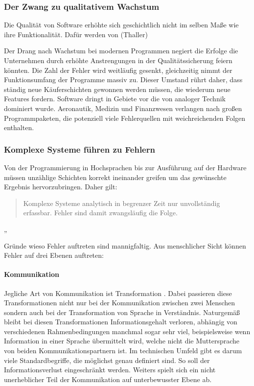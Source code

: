 \subsubsection{Der Zwang zu qualitativem Wachstum}
Die Qualität von Software erhöhte sich geschichtlich nicht im selben Maße wie ihre Funktionalität. Dafür werden von (Thaller)\cite{thaller_software-test:_2002}

Der Drang nach Wachstum bei modernen Programmen negiert die Erfolge die Unternehmen durch erhöhte Anstrengungen in der Qualitätssicherung feiern könnten. Die Zahl der Fehler wird weitläufig gesenkt,  gleichzeitig nimmt der Funktionsumfang der Programme massiv zu. Dieser Umstand rührt daher, dass ständig neue Käuferschichten gewonnen werden müssen, die wiederum neue Features fordern.
Software dringt in Gebiete vor die von analoger Technik dominiert wurde. Aeronautik, Medizin und Finanzwesen verlangen nach großen Programmpaketen, die potenziell viele Fehlerquellen mit weichreichenden Folgen enthalten.

\subsubsection{Komplexe Systeme führen zu Fehlern}
Von der Programmierung in Hochsprachen bis zur Ausführung auf der Hardware müssen unzählige Schichten korrekt ineinander greifen um das gewünschte Ergebnis hervorzubringen. 
Daher gilt:

\begin{quote}
Komplexe Systeme analytisch in begrenzer Zeit nur unvollständig erfassbar. Fehler sind damit zwangsläufig die Folge. \cite{vigenschow_objektorientiertes_2004}
\end{quote} „

Gründe wieso Fehler auftreten sind mannigfaltig. Aus menschlicher Sicht können Fehler auf drei Ebenen auftreten: \cite{vigenschow_objektorientiertes_2004}

\paragraph{Kommunikation}
Jegliche Art von Kommunikation ist Transformation \cite{shannon_mathematische_1976}. Dabei passieren diese Transformationen nicht nur bei der Kommunikation zwischen zwei Menschen sondern auch bei der Transformation von Sprache in Verständnis. Naturgemäß bleibt bei diesen Transformationen Informationsgehalt verloren, abhängig von verschiedenen Rahmenbedingungen manchmal sogar sehr viel, beispielsweise wenn Information in einer Sprache übermittelt wird, welche nicht die Muttersprache von beiden Kommunikationspartnern ist.
Im technischen Umfeld gibt es darum viele Standardbegriffe, die möglichst genau definiert sind. So soll der Informationsverlust eingeschränkt werden.
Weiters spielt sich ein nicht unerheblicher Teil der Kommunikation auf unterbewusster Ebene ab.

